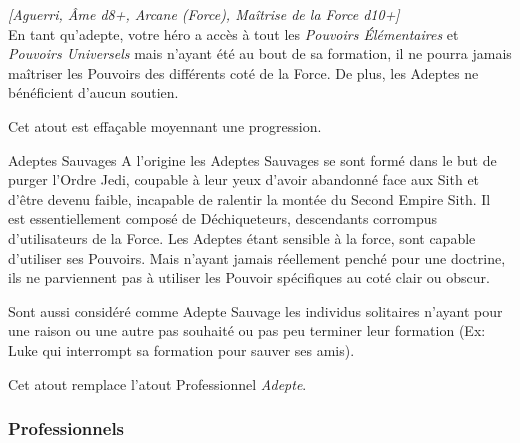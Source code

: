 \begin{description}[align=left]
    \item [Adepte Sauvage]
        \emph{[Aguerri, \^Ame d8+, Arcane (Force), Maîtrise de la Force d10+]}\\
        En tant qu’adepte, votre héro a accès à tout les \emph{Pouvoirs \'Elémentaires} et \emph{Pouvoirs Universels} mais n’ayant été au bout de sa formation, il ne pourra jamais maîtriser les Pouvoirs des différents coté de la Force. De plus, les Adeptes ne bénéficient d’aucun soutien.

        Cet atout est effaçable moyennant une progression.
        
\end{description}

\begin{paperbox}{Adeptes Sauvages}
A l’origine les Adeptes Sauvages se sont formé dans le but de purger l’Ordre Jedi, coupable à leur yeux d’avoir abandonné face aux Sith et d’être devenu faible, incapable de ralentir la montée du Second Empire Sith. Il est essentiellement composé de Déchiqueteurs, descendants corrompus d’utilisateurs de la Force. Les Adeptes étant sensible à la force, sont capable d’utiliser ses Pouvoirs. Mais n’ayant jamais réellement penché pour une doctrine, ils ne parviennent pas à utiliser les Pouvoir spécifiques au coté clair ou obscur.

Sont aussi considéré comme Adepte Sauvage les individus solitaires n’ayant pour une raison ou une autre pas souhaité ou pas peu terminer leur formation (Ex: Luke qui interrompt sa formation pour sauver ses amis). 

Cet atout remplace l’atout Professionnel \emph{Adepte}.
\end{paperbox}

\newpage
\subsubsection{Professionnels}

